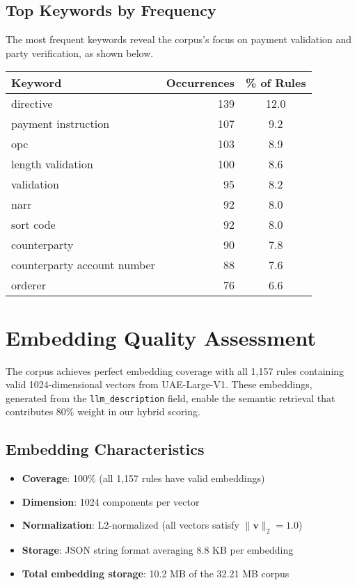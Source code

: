 \subsection{Top Keywords by Frequency}

The most frequent keywords reveal the corpus's focus on payment validation and party verification, as shown below.

\vspace{0.5em}
\noindent
\begin{minipage}{\textwidth}
\centering
\begin{tabular}{lrc}
\toprule
\textbf{Keyword} & \textbf{Occurrences} & \textbf{\% of Rules} \\
\midrule
directive & 139 & 12.0 \\
payment instruction & 107 & 9.2 \\
opc & 103 & 8.9 \\
length validation & 100 & 8.6 \\
validation & 95 & 8.2 \\
narr & 92 & 8.0 \\
sort code & 92 & 8.0 \\
counterparty & 90 & 7.8 \\
counterparty account number & 88 & 7.6 \\
orderer & 76 & 6.6 \\
\bottomrule
\end{tabular}
\label{tab:top-keywords}
\end{minipage}
\vspace{0.5em}

\section{Embedding Quality Assessment}

The corpus achieves perfect embedding coverage with all 1,157 rules containing valid 1024-dimensional vectors from UAE-Large-V1. These embeddings, generated from the \texttt{llm\_description} field, enable the semantic retrieval that contributes 80\% weight in our hybrid scoring.

\subsection{Embedding Characteristics}

\begin{itemize}[leftmargin=*,itemsep=2pt,topsep=2pt]
 \item \textbf{Coverage}: 100\% (all 1,157 rules have valid embeddings)
 \item \textbf{Dimension}: 1024 components per vector
 \item \textbf{Normalization}: L2-normalized (all vectors satisfy $\|\mathbf{v}\|_2 = 1.0$)
 \item \textbf{Storage}: JSON string format averaging 8.8 KB per embedding
 \item \textbf{Total embedding storage}: 10.2 MB of the 32.21 MB corpus
\end{itemize}

